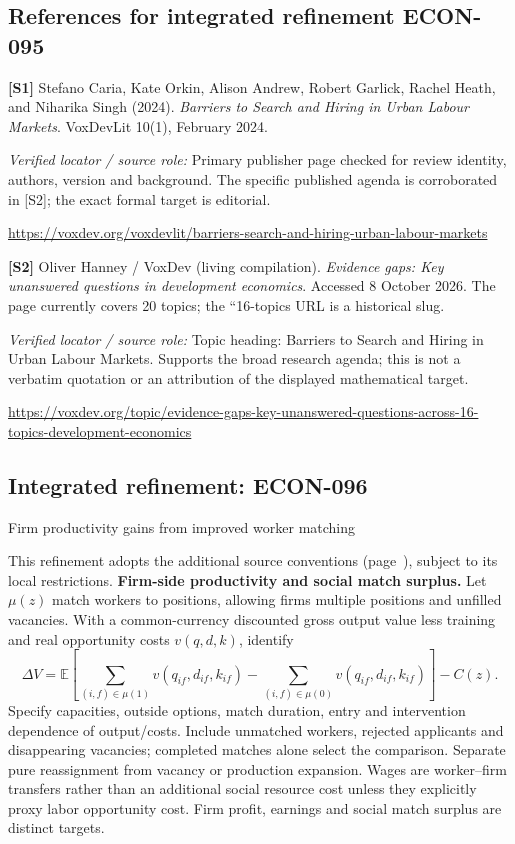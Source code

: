 \documentclass[11pt,a4paper]{article}
\begin{document}
\subsection*{References for integrated refinement ECON-095}
{\footnotesize\raggedright
\par\noindent\textbf{[S1]} Stefano Caria, Kate Orkin, Alison Andrew, Robert Garlick, Rachel Heath, and Niharika Singh (2024). \emph{Barriers to Search and Hiring in Urban Labour Markets}. VoxDevLit 10(1), February 2024.\par \textit{Verified locator / source role:} Primary publisher page checked for review identity, authors, version and background. The specific published agenda is corroborated in [S2]; the exact formal target is editorial.\par \url{https://voxdev.org/voxdevlit/barriers-search-and-hiring-urban-labour-markets}\par\smallskip
\par\noindent\textbf{[S2]} Oliver Hanney / VoxDev (living compilation). \emph{Evidence gaps: Key unanswered questions in development economics}. Accessed 8 October 2026. The page currently covers 20 topics; the ``16-topics URL is a historical slug.\par \textit{Verified locator / source role:} Topic heading: Barriers to Search and Hiring in Urban Labour Markets. Supports the broad research agenda; this is not a verbatim quotation or an attribution of the displayed mathematical target.\par \url{https://voxdev.org/topic/evidence-gaps-key-unanswered-questions-across-16-topics-development-economics}\par\smallskip
}

\subsection*{Integrated refinement: ECON-096}
{\sffamily\small\color{muted}Firm productivity gains from improved worker matching\par}
This refinement adopts the additional source conventions
(page~\pageref{audited:conventions}), subject to its local restrictions.
\textbf{Firm-side productivity and social match surplus.}
Let $\mu(z)$ match workers to positions, allowing firms multiple positions and
unfilled vacancies. With a common-currency discounted gross output value less
training and real opportunity costs $v(q,d,k)$, identify
\[
\Delta V=\mathbb E\left[\sum_{(i,f)\in\mu(1)}v(q_{if},d_{if},k_{if})
       -\sum_{(i,f)\in\mu(0)}v(q_{if},d_{if},k_{if})\right]-C(z).
\]
Specify capacities, outside options, match duration, entry and intervention
dependence of output/costs. Include unmatched workers, rejected applicants and
disappearing vacancies; completed matches alone select the comparison.
Separate pure reassignment from vacancy or production expansion. Wages are
worker--firm transfers rather than an additional social resource cost unless
they explicitly proxy labor opportunity cost. Firm profit, earnings and social
match surplus are distinct targets.
\end{document}
